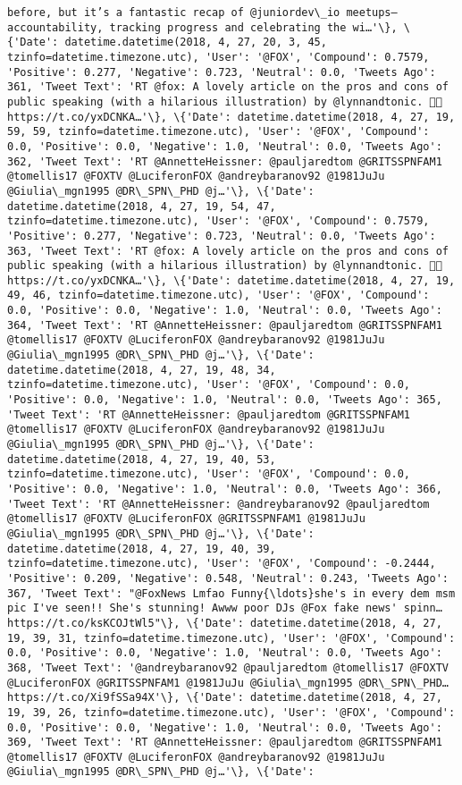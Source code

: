 \documentclass[11pt]{article}
\begin{document}
\begin{Verbatim}[commandchars=\\\{\}]
before, but it’s a fantastic recap of @juniordev\_io meetups—accountability, tracking progress and celebrating the wi…'\}, \{'Date': datetime.datetime(2018, 4, 27, 20, 3, 45, tzinfo=datetime.timezone.utc), 'User': '@FOX', 'Compound': 0.7579, 'Positive': 0.277, 'Negative': 0.723, 'Neutral': 0.0, 'Tweets Ago': 361, 'Tweet Text': 'RT @fox: A lovely article on the pros and cons of public speaking (with a hilarious illustration) by @lynnandtonic. 👏🏻 https://t.co/yxDCNKA…'\}, \{'Date': datetime.datetime(2018, 4, 27, 19, 59, 59, tzinfo=datetime.timezone.utc), 'User': '@FOX', 'Compound': 0.0, 'Positive': 0.0, 'Negative': 1.0, 'Neutral': 0.0, 'Tweets Ago': 362, 'Tweet Text': 'RT @AnnetteHeissner: @pauljaredtom @GRITSSPNFAM1 @tomellis17 @FOXTV @LuciferonFOX @andreybaranov92 @1981JuJu @Giulia\_mgn1995 @DR\_SPN\_PHD @j…'\}, \{'Date': datetime.datetime(2018, 4, 27, 19, 54, 47, tzinfo=datetime.timezone.utc), 'User': '@FOX', 'Compound': 0.7579, 'Positive': 0.277, 'Negative': 0.723, 'Neutral': 0.0, 'Tweets Ago': 363, 'Tweet Text': 'RT @fox: A lovely article on the pros and cons of public speaking (with a hilarious illustration) by @lynnandtonic. 👏🏻 https://t.co/yxDCNKA…'\}, \{'Date': datetime.datetime(2018, 4, 27, 19, 49, 46, tzinfo=datetime.timezone.utc), 'User': '@FOX', 'Compound': 0.0, 'Positive': 0.0, 'Negative': 1.0, 'Neutral': 0.0, 'Tweets Ago': 364, 'Tweet Text': 'RT @AnnetteHeissner: @pauljaredtom @GRITSSPNFAM1 @tomellis17 @FOXTV @LuciferonFOX @andreybaranov92 @1981JuJu @Giulia\_mgn1995 @DR\_SPN\_PHD @j…'\}, \{'Date': datetime.datetime(2018, 4, 27, 19, 48, 34, tzinfo=datetime.timezone.utc), 'User': '@FOX', 'Compound': 0.0, 'Positive': 0.0, 'Negative': 1.0, 'Neutral': 0.0, 'Tweets Ago': 365, 'Tweet Text': 'RT @AnnetteHeissner: @pauljaredtom @GRITSSPNFAM1 @tomellis17 @FOXTV @LuciferonFOX @andreybaranov92 @1981JuJu @Giulia\_mgn1995 @DR\_SPN\_PHD @j…'\}, \{'Date': datetime.datetime(2018, 4, 27, 19, 40, 53, tzinfo=datetime.timezone.utc), 'User': '@FOX', 'Compound': 0.0, 'Positive': 0.0, 'Negative': 1.0, 'Neutral': 0.0, 'Tweets Ago': 366, 'Tweet Text': 'RT @AnnetteHeissner: @andreybaranov92 @pauljaredtom @tomellis17 @FOXTV @LuciferonFOX @GRITSSPNFAM1 @1981JuJu @Giulia\_mgn1995 @DR\_SPN\_PHD @j…'\}, \{'Date': datetime.datetime(2018, 4, 27, 19, 40, 39, tzinfo=datetime.timezone.utc), 'User': '@FOX', 'Compound': -0.2444, 'Positive': 0.209, 'Negative': 0.548, 'Neutral': 0.243, 'Tweets Ago': 367, 'Tweet Text': "@FoxNews Lmfao Funny{\ldots}she's in every dem msm pic I've seen!! She's stunning! Awww poor DJs @Fox fake news' spinn… https://t.co/ksKCOJtWl5"\}, \{'Date': datetime.datetime(2018, 4, 27, 19, 39, 31, tzinfo=datetime.timezone.utc), 'User': '@FOX', 'Compound': 0.0, 'Positive': 0.0, 'Negative': 1.0, 'Neutral': 0.0, 'Tweets Ago': 368, 'Tweet Text': '@andreybaranov92 @pauljaredtom @tomellis17 @FOXTV @LuciferonFOX @GRITSSPNFAM1 @1981JuJu @Giulia\_mgn1995 @DR\_SPN\_PHD… https://t.co/Xi9fSSa94X'\}, \{'Date': datetime.datetime(2018, 4, 27, 19, 39, 26, tzinfo=datetime.timezone.utc), 'User': '@FOX', 'Compound': 0.0, 'Positive': 0.0, 'Negative': 1.0, 'Neutral': 0.0, 'Tweets Ago': 369, 'Tweet Text': 'RT @AnnetteHeissner: @pauljaredtom @GRITSSPNFAM1 @tomellis17 @FOXTV @LuciferonFOX @andreybaranov92 @1981JuJu @Giulia\_mgn1995 @DR\_SPN\_PHD @j…'\}, \{'Date': 
\end{Verbatim}
\end{document}

